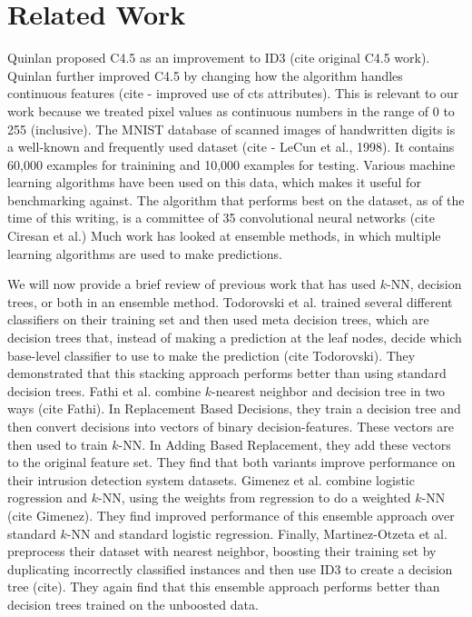 \section{Related Work}
Quinlan proposed C4.5 as an improvement to ID3 (cite original C4.5 work). Quinlan further improved C4.5 by changing how the algorithm handles continuous features (cite - improved use of cts attributes). This is relevant to our work because we treated pixel values as continuous numbers in the range of 0 to 255 (inclusive). 
The MNIST database of scanned images of handwritten digits is a well-known and frequently used dataset (cite - LeCun et al., 1998). It contains 60,000 examples for trainining and 10,000 examples for testing. Various machine learning algorithms have been used on this data, which makes it useful for benchmarking against. The algorithm that performs best on the dataset, as of the time of this writing, is a committee of 35 convolutional neural networks (cite Ciresan et al.)
Much work has looked at ensemble methods, in which multiple learning algorithms are used to make predictions. 

We will now provide a brief review of previous work that has used $k$-NN, decision trees, or both in an ensemble method. Todorovski et al. trained several different classifiers on their training set and then used meta decision trees, which are decision trees that, instead of making a prediction at the leaf nodes, decide which base-level classifier to use to make the prediction (cite Todorovski). They demonstrated that this stacking approach performs better than using standard decision trees.
Fathi et al. combine $k$-nearest neighbor and decision tree in two ways (cite Fathi). In Replacement Based Decisions, they train a decision tree and then convert decisions into vectors of binary decision-features. These vectors are then used to train $k$-NN. In Adding Based Replacement, they add these vectors to the original feature set. They find that both variants improve performance on their intrusion detection system datasets.
Gimenez et al. combine logistic rogression and $k$-NN, using the weights from regression to do a weighted $k$-NN (cite Gimenez). They find improved performance of this ensemble approach over standard $k$-NN and standard logistic regression. Finally, Martinez-Otzeta et al. preprocess their dataset with nearest neighbor, boosting their training set by duplicating incorrectly classified instances and then use ID3 to create a decision tree (cite). They again find that this ensemble approach performs better than decision trees trained on the unboosted data. 

